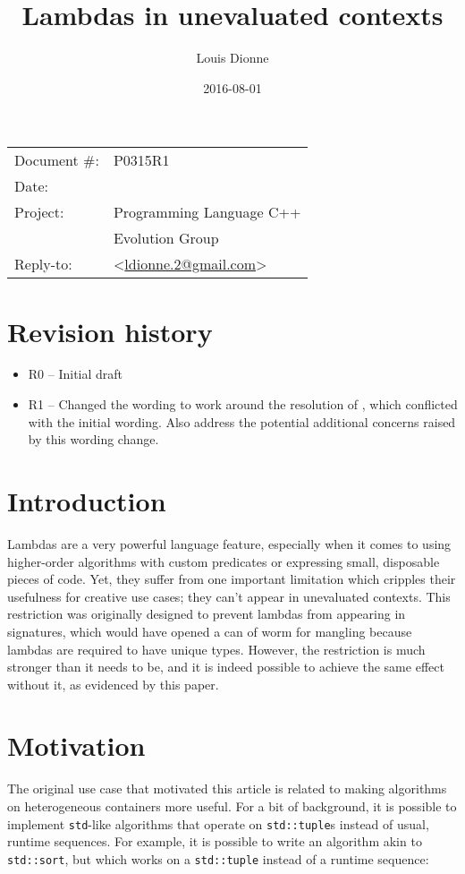 \documentclass[11pt]{article}
\date{}
\title{Lambdas in unevaluated contexts}
\author{}
\newcommand{\cc}[1]{\texttt{#1}}
\begin{document}
\maketitle\vspace{-2cm}

\begin{flushright}
  \begin{tabular}{ll}
  Document \#:&P0315R1\\
  Date:       &\date{2016-08-01}\\
  Project:    &Programming Language C++\\
              &Evolution Group\\
  Reply-to:   &\author{Louis Dionne} \textless\href{mailto:ldionne.2@gmail.com}{ldionne.2@gmail.com}\textgreater
  \end{tabular}
\end{flushright}

\section{Revision history}
\begin{itemize}
  \item R0 -- Initial draft
  \item R1 -- Changed the wording to work around the resolution of \cite{DR1607},
              which conflicted with the initial wording. Also address the
              potential additional concerns raised by this wording change.
\end{itemize}


\section{Introduction}
Lambdas are a very powerful language feature, especially when it comes to using
higher-order algorithms with custom predicates or expressing small, disposable
pieces of code. Yet, they suffer from one important limitation which cripples
their usefulness for creative use cases; they can't appear in unevaluated
contexts. This restriction was originally designed to prevent lambdas from
appearing in signatures, which would have opened a can of worm for mangling
because lambdas are required to have unique types. However, the restriction is
much stronger than it needs to be, and it is indeed possible to achieve the
same effect without it, as evidenced by this paper.


\section{Motivation}
The original use case that motivated this article is related to making algorithms
on heterogeneous containers more useful. For a bit of background, it is possible
to implement \cc{std}-like algorithms that operate on \cc{std::tuple}s instead of
usual, runtime sequences. For example, it is possible to write an algorithm akin
to \cc{std::sort}, but which works on a \cc{std::tuple} instead of a runtime
sequence:
\end{document}
